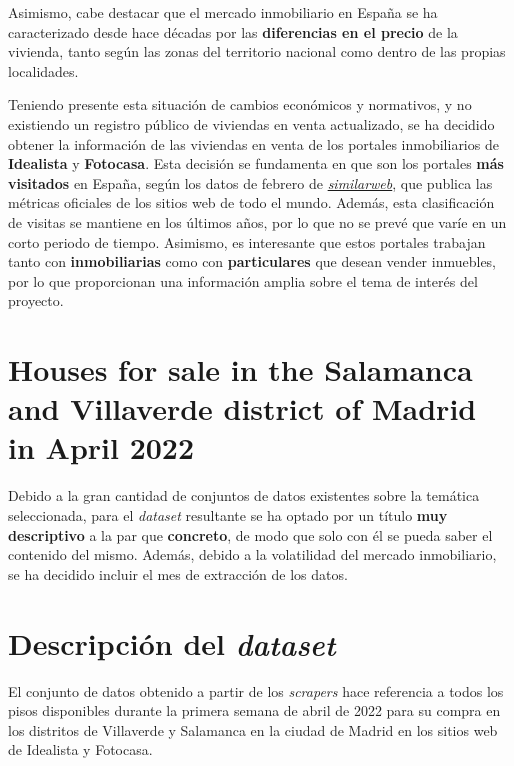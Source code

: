 \documentclass[12pt]{article}
\begin{document}
Asimismo, cabe destacar que el mercado inmobiliario en España se ha caracterizado desde hace décadas por las \textbf{diferencias en el precio} de la vivienda, tanto según las zonas del territorio nacional como dentro de las propias localidades. 

Teniendo presente esta situación de cambios económicos y normativos, y no existiendo un registro público de viviendas en venta actualizado, se ha decidido obtener la información de las viviendas en venta de los portales inmobiliarios de \textbf{Idealista} y \textbf{Fotocasa}. Esta decisión se fundamenta en que son los portales \textbf{más visitados} en España, según los datos de febrero de \href{https://www.similarweb.com/top-websites/spain/category/business-and-consumer-services/real-estate/}{\textit{similarweb}}, que publica las métricas oficiales de los sitios web de todo el mundo. Además, esta clasificación de visitas se mantiene en los últimos años, por lo que no se prevé que varíe en un corto periodo de tiempo. Asimismo, es interesante que estos portales trabajan tanto con \textbf{inmobiliarias} como con \textbf{particulares} que desean vender inmuebles, por lo que proporcionan una información amplia sobre el tema de interés del proyecto.

\vspace{-1.5em}\section{Houses for sale in the Salamanca and Villaverde district of Madrid in April 2022}\vspace{-1.0em}

Debido a la gran cantidad de conjuntos de datos existentes sobre la temática seleccionada, para el \textit{dataset} resultante se ha optado por un título \textbf{muy descriptivo} a la par que \textbf{concreto}, de modo que solo con él se pueda saber el contenido del mismo. Además, debido a la volatilidad del mercado inmobiliario, se ha decidido incluir el mes de extracción de los datos.

\vspace{-1.5em}\section{Descripción del \textit{dataset}}\vspace{-1.0em}

El conjunto de datos obtenido a partir de los \textit{scrapers} hace referencia a todos los pisos disponibles durante la primera semana de abril de 2022 para su compra en los distritos de Villaverde y Salamanca en la ciudad de Madrid en los sitios web de Idealista y Fotocasa.
\end{document}
